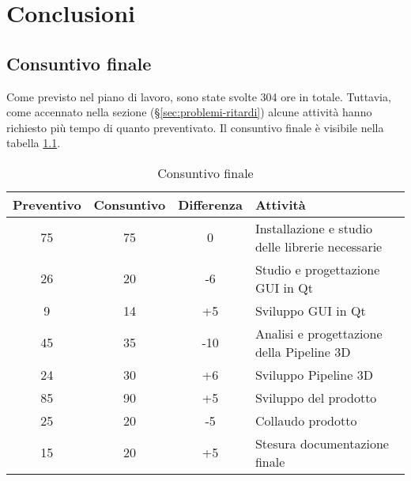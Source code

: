 
\chapter{Conclusioni}
\label{cap:conclusioni}

\section{Consuntivo finale}
Come previsto nel piano di lavoro, sono state svolte 304 ore in totale. Tuttavia, come accennato nella sezione  (§\ref{sec:problemi-ritardi}) alcune attività hanno richiesto più tempo di quanto preventivato. Il consuntivo finale è visibile nella tabella \ref{table:consuntivo-finale}.

\begin{center}
    \begin{table}[h]
    \def\arraystretch{1.5}
    \begin{tabular}{| c | c | c | p{5cm} |}
        \hline
        \textbf{Preventivo} & \textbf{Consuntivo} & \textbf{Differenza} & \textbf{Attività} \\ \hline  
        75 & 75 & 0 & Installazione e studio delle librerie necessarie\\ \hline
        26 & 20 & -6 & Studio e progettazione GUI in Qt\\ \hline
        9 & 14 & +5 & Sviluppo GUI in Qt\\ \hline
        45 & 35 & -10 & Analisi e progettazione della Pipeline 3D\\ \hline
        24 & 30 & +6 & Sviluppo Pipeline 3D\\ \hline
        85 & 90 & +5 & Sviluppo del prodotto\\ \hline
        25 & 20 & -5 & Collaudo prodotto\\ \hline
        15 & 20 & +5 & Stesura documentazione finale\\ \hline
    \end{tabular}
    \caption{Consuntivo finale}
    \label{table:consuntivo-finale}
    \end{table}
\end{center}

